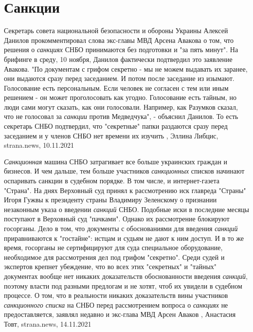  
 
 
 
 
\chapter{Санкции}
\label{sec:slova.sankcii}

Секретарь совета национальной безопасности и обороны Украины Алексей Данилов
прокомментировал слова экс-главы МВД Арсена Авакова о том, что решения о
\emph{санкциях} СНБО принимаются без подготовки и "за пять минут".  На брифинге в
среду, 10 ноября, Данилов фактически подтвердил это заявление Авакова.  "По
документам с грифом секретно - мы не можем выдавать их заранее, они выдаются
сразу перед заседанием. И потом после заседание из изымают.  Голосование есть
персональным. Если человек не согласен с тем или иным решением - он может
проголосовать как угодно. Голосование есть тайным, но люди сами могут сказать,
как они голосовали. Например, как Разумков сказал, что не голосовал за \emph{санкции}
против Медведчука", - объяснил Данилов.  То есть секретарь СНБО подтвердил, что
"секретные" папки раздаются сразу перед заседанием и у членов СНБО нет времени
их изучить
, 
Эллина Либцис, strana.news, 10.11.2021

\emph{Санкционная} машина СНБО затрагивает все больше украинских граждан и бизнесов. И
чем дальше, тем больше участников \emph{санкционных} списков начинают оспаривать
санкции в судебном порядке. В том числе, и интернет-газета "Страна".  На днях
Верховный суд принял к рассмотрению иск главреда "Страны" Игоря Гужвы к
президенту страны Владимиру Зеленскому о признании незаконным указа о введении
\emph{санкций} СНБО.  Подобные иски в последние месяцы поступают в Верховный суд
"пачками". Однако их рассмотрение блокируют госорганы. Дело в том, что
документы с обоснованиями для введения \emph{санкций} приравниваются к "гостайне":
истцам и судьям не дают к ним доступ. И в то же время, госорганы не
сертифицируют для суда специальное оборудование, необходимое для рассмотрения
дел под грифом "секретно".  Среди судей и экспертов крепнет убеждение, что во
всех этих "секретных" и "тайных" документах вообще нет никаких доказательств
обоснованности введения \emph{санкций}, поэтому власти под разными предлогам и не
хотят, чтоб их увидели в судебном процессе.  О том, что в реальности никаких
доказательств вины участников \emph{санкционного списка} на СНБО перед рассмотрением
вопроса о \emph{санкциях} не предоставляется, заявлял недавно и экс-глава МВД Арсен
Аваков
, 
Анастасия Товт, strana.news, 14.11.2021

